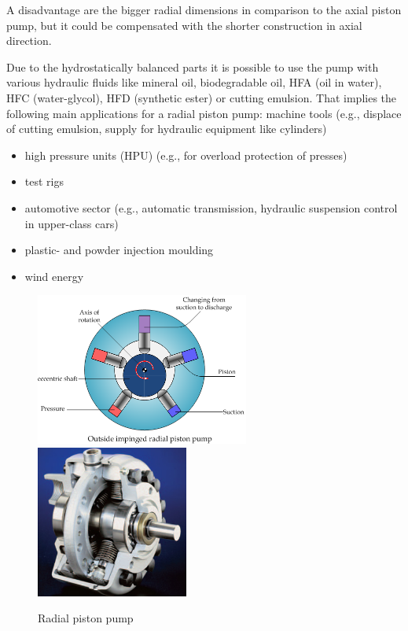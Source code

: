 A disadvantage are the bigger radial dimensions in comparison to the axial piston pump, but it could be compensated with the shorter construction in axial direction.

Due to the hydrostatically balanced parts it is possible to use the pump with various hydraulic fluids like mineral oil, biodegradable oil, HFA (oil in water), HFC (water-glycol), HFD (synthetic ester) or cutting emulsion. That implies the following main applications for a radial piston pump:
machine tools (e.g., displace of cutting emulsion, supply for hydraulic equipment like cylinders)
\begin{itemize}
\item high pressure units (HPU) (e.g., for overload protection of presses)
\item test rigs
\item automotive sector (e.g., automatic transmission, hydraulic suspension control in upper-class cars)
\item plastic- and powder injection moulding
\item wind energy
\end{itemize}

\begin{figure}[h!]
\begin{center}
\includegraphics[height=5cm]{figs/radial_piston_pump1.png}
\includegraphics[height=5cm]{figs/radial_piston_pump_cutaway.jpg}
\caption{\label{fig:rad_pp} Radial piston pump}
\end{center}
\end{figure}

